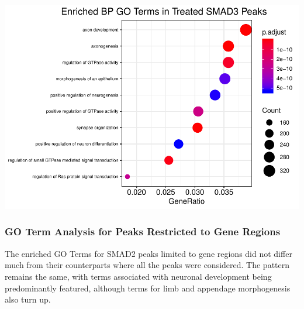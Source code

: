 \documentclass[]{article}
\begin{document}
\clearpage{}

\includegraphics{Bioinfo_Analysis_files/figure-latex/unnamed-chunk-14-1.pdf}

\hypertarget{go-term-analysis-for-peaks-restricted-to-gene-regions}{%
\subsubsection{GO Term Analysis for Peaks Restricted to Gene
Regions}\label{go-term-analysis-for-peaks-restricted-to-gene-regions}}

The enriched GO Terms for SMAD2 peaks limited to gene regions did not
differ much from their counterparts where all the peaks were considered.
The pattern remains the same, with terms associated with neuronal
development being predominantly featured, although terms for limb and
appendage morphogenesis also turn up.

\clearpage{}
\end{document}
